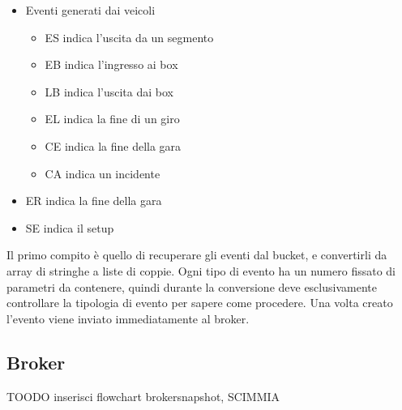\begin{itemize}
 \item Eventi generati dai veicoli
 \begin{itemize}
  \item ES indica l’uscita da un segmento
  \item EB indica l’ingresso ai box
  \item LB indica l’uscita dai box
  \item EL indica la fine di un giro
  \item CE indica la fine della gara
  \item CA indica un incidente
 \end{itemize}
 \item ER indica la fine della gara
 \item SE indica il setup
\end{itemize}

Il primo compito è quello di recuperare gli eventi dal bucket, e convertirli da array di stringhe a liste di coppie. Ogni tipo di evento ha un numero fissato di parametri da contenere, quindi durante la conversione deve esclusivamente controllare la tipologia di evento per sapere come procedere.
Una volta creato l’evento viene inviato immediatamente al broker.

\subsection{Broker}
TOODO inserisci flowchart brokersnapshot, SCIMMIA

